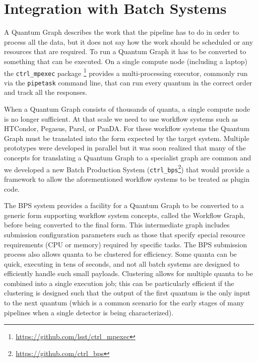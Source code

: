\documentclass[]{spie}
\begin{document}
\section{Integration with Batch Systems}

A Quantum Graph describes the work that the pipeline has to do in order to process all the data, but it does not say how the work should be scheduled or any resources that are required.
To run a Quantum Graph it has to be converted to something that can be executed.
On a single compute node (including a laptop) the \texttt{ctrl\_mpexec} package \footnote{\url{https://github.com/lsst/ctrl_mpexec}} provides a multi-processing executor, commonly run via the \texttt{pipetask} command line, that can run every quantum in the correct order and track all the responses.

When a Quantum Graph consists of thousands of quanta, a single compute node is no longer sufficient.
At that scale we need to use workflow systems such as HTCondor,\cite{10.1002/cpe.938} Pegasus,\cite{10.1016/j.future.2014.10.008} Parsl,\cite{10.1145/3307681.3325400} or PanDA.\cite{10.1088/1742-6596/331/7/072024}
For these workflow systems the Quantum Graph must be translated into the form expected by the target system.
Multiple prototypes were developed in parallel\cite{2020arXiv201106044B,DMTN-123,DMTN-137} but it was soon realized that many of the concepts for translating a Quantum Graph to a specialist graph are common and we developed a new Batch Production System (\texttt{ctrl\_bps}\footnote{\url{https://github.com/ctrl_bps}}) that would provide a framework to allow the aforementioned workflow systems to be treated as plugin code.

The BPS system provides a facility for a Quantum Graph to be converted to a generic form supporting workflow system concepts, called the Workflow Graph, before being converted to the final form.
This intermediate graph includes submission configuration parameters such as those that specify special resource requirements (CPU or memory) required by specific tasks.
The BPS submission process also allows quanta to be clustered for efficiency.
Some quanta can be quick, executing in tens of seconds, and not all batch systems are designed to efficiently handle such small payloads.
Clustering allows for multiple quanta to be combined into a single execution job; this can be particularly efficient if the clustering is designed such that the output of the first quantum is the only input to the next quantum (which is a common scenario for the early stages of many pipelines when a single detector is being characterized).
\end{document}
